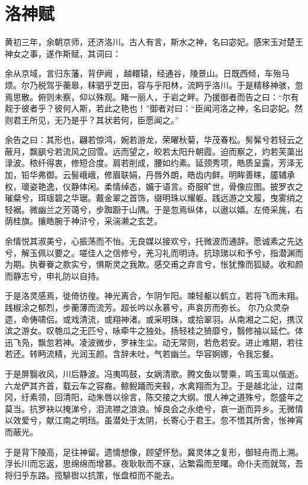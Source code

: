\section{ 洛神赋}

黄初三年，余朝京师，还济洛川。古人有言，斯水之神，名曰宓妃。感宋玉对楚王神女之事，遂作斯赋，其词曰：

余从京域，言归东藩，背伊阙 ，越轘辕，经通谷，陵景山。日既西倾，车殆马烦。尔乃税驾乎蘅皋，秣驷乎芝田，容与乎阳林，流眄乎洛川。于是精移神骇，忽焉思散。俯则未察，仰以殊观。睹一丽人，于岩之畔。乃援御者而告之曰：“尔有觌于彼者乎？彼何人斯，若此之艳也！”御者对曰：“臣闻河洛之神，名曰宓妃。然则君王所见，无乃是乎？其状若何，臣愿闻之。”

余告之曰：其形也，翩若惊鸿，婉若游龙，荣曜秋菊，华茂春松。髣髴兮若轻云之蔽月，飘飖兮若流风之回雪。远而望之，皎若太阳升朝霞。迫而察之，灼若芙蕖出渌波。秾纤得衷，修短合度。肩若削成，腰如约素。延颈秀项，皓质呈露，芳泽无加，铅华弗御。云髻峨峨，修眉联娟，丹唇外朗，皓齿内鲜。明眸善睐，靥辅承权，瓌姿艳逸，仪静体闲。柔情绰态，媚于语言。奇服旷世，骨像应图。披罗衣之璀粲兮，珥瑶碧之华琚。戴金翠之首饰，缀明珠以耀躯。践远游之文履，曳雾绡之轻裾。微幽兰之芳蔼兮，步踟蹰于山隅。于是忽焉纵体，以遨以嬉。左倚采旄，右荫桂旗。攘皓腕于神浒兮，采湍濑之玄芝。

余情悦其淑美兮，心振荡而不怡。无良媒以接欢兮，托微波而通辞。愿诚素之先达兮，解玉佩以要之。嗟佳人之信修兮，羌习礼而明诗。抗琼珶以和予兮，指潜渊而为期。执眷眷之款实兮，惧斯灵之我欺。感交甫之弃言兮，怅犹豫而狐疑。收和颜而静志兮，申礼防以自持。

于是洛灵感焉，徙倚彷徨。神光离合，乍阴乍阳。竦轻躯以鹤立，若将飞而未翔。践椒涂之郁烈，步蘅薄而流芳。超长吟以永慕兮，声哀厉而弥长。 尔乃众灵杂遝，命俦啸侣。或戏清流，或翔神渚。或采明珠，或拾翠羽。从南湘之二妃，携汉滨之游女。叹匏瓜之无匹兮，咏牵牛之独处。扬轻袿之猗靡兮，翳修袖以延伫。体迅飞凫，飘忽若神。凌波微步，罗袜生尘。动无常则，若危若安。进止难期，若往若还。转眄流精，光润玉颜。含辞未吐，气若幽兰。华容婀娜，令我忘餐。

于是屏翳收风，川后静波。冯夷鸣鼓，女娲清歌。腾文鱼以警乘，鸣玉鸾以偕逝。六龙俨其齐首，载云车之容裔。鲸鲵踊而夹毂，水禽翔而为卫。于是越北沚，过南冈，纡素领，回清阳，动朱唇以徐言，陈交接之大纲。恨人神之道殊兮，怨盛年之莫当。抗罗袂以掩涕兮，泪流襟之浪浪。悼良会之永绝兮，哀一逝而异乡。无微情以效爱兮，献江南之明珰。虽潜处于太阴，长寄心于君王。忽不悟其所舍，怅神宵而蔽光。

于是背下陵高，足往神留。遗情想像，顾望怀愁。冀灵体之复形，御轻舟而上溯。浮长川而忘返，思绵绵而增慕。夜耿耿而不寐，沾繁霜而至曙。命仆夫而就驾，吾将归乎东路。揽騑辔以抗策，怅盘桓而不能去。